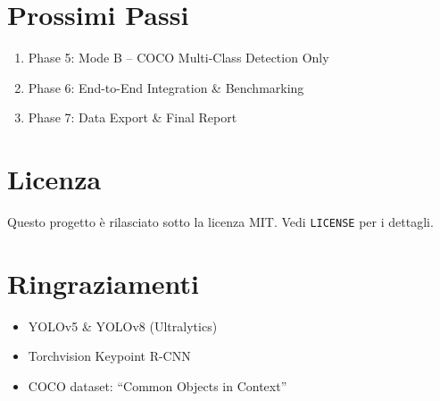 \documentclass[11pt]{article}
\begin{document}
\section*{Prossimi Passi}
\begin{enumerate}
  \item Phase 5: Mode B – COCO Multi-Class Detection Only
  \item Phase 6: End-to-End Integration \& Benchmarking
  \item Phase 7: Data Export \& Final Report
\end{enumerate}

\section*{Licenza}
Questo progetto è rilasciato sotto la licenza MIT. Vedi \texttt{LICENSE} per i dettagli.

\section*{Ringraziamenti}
\begin{itemize}
  \item YOLOv5 \& YOLOv8 (Ultralytics)
  \item Torchvision Keypoint R-CNN
  \item COCO dataset: “Common Objects in Context”
\end{itemize}
\end{document}
